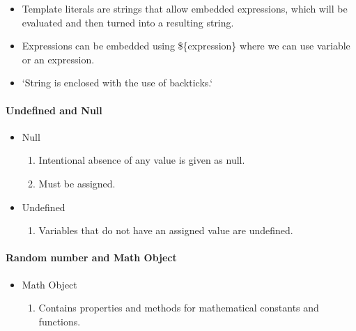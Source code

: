 \documentclass[
  paper=a4,
  ,captions=tableheading
]{scrartcl}
\providecommand{\tightlist}{%
  \setlength{\itemsep}{0pt}\setlength{\parskip}{0pt}}
\begin{document}
\begin{itemize}
\tightlist
\item
  Template literals are strings that allow embedded expressions, which
  will be evaluated and then turned into a resulting string.
\item
  Expressions can be embedded using \$\{expression\} where we can use
  variable or an expression.
\item
  `String is enclosed with the use of backticks.`
\end{itemize}

\hypertarget{undefined-and-null}{%
\paragraph{Undefined and Null}\label{undefined-and-null}}

\begin{itemize}
\tightlist
\item
  Null

  \begin{enumerate}
  \def\labelenumi{\arabic{enumi}.}
  \tightlist
  \item
    Intentional absence of any value is given as null.
  \item
    Must be assigned.
  \end{enumerate}
\item
  Undefined

  \begin{enumerate}
  \def\labelenumi{\arabic{enumi}.}
  \tightlist
  \item
    Variables that do not have an assigned value are undefined.
  \end{enumerate}
\end{itemize}

\hypertarget{random-number-and-math-object}{%
\paragraph{Random number and Math
Object}\label{random-number-and-math-object}}

\begin{itemize}
\tightlist
\item
  Math Object

  \begin{enumerate}
  \def\labelenumi{\arabic{enumi}.}
  \tightlist
  \item
    Contains properties and methods for mathematical constants and
    functions.
  \end{enumerate}
\end{itemize}
\end{document}
